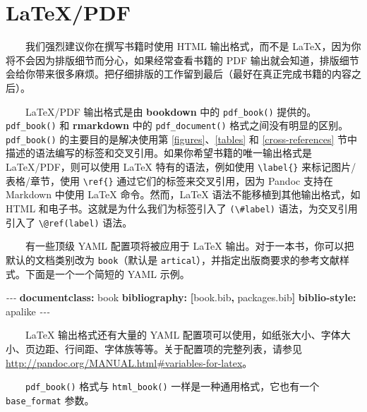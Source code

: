 \documentclass[
  12pt,
]{krantz}
\newenvironment{Shaded}{\begin{snugshade}}{\end{snugshade}}
\newcommand{\AttributeTok}[1]{\textcolor[rgb]{0.13,0.29,0.53}{#1}}
\newcommand{\FunctionTok}[1]{\textcolor[rgb]{0.13,0.29,0.53}{\textbf{#1}}}
\newcommand{\KeywordTok}[1]{\textcolor[rgb]{0.13,0.29,0.53}{\textbf{#1}}}
\newcommand{\PreprocessorTok}[1]{\textcolor[rgb]{0.56,0.35,0.01}{\textit{#1}}}
\theoremstyle{definition}
\theoremstyle{definition}
\theoremstyle{definition}
\theoremstyle{definition}
\theoremstyle{remark}
\begin{document}
\hypertarget{latexpdf}{%
\section{LaTeX/PDF}\label{latexpdf}}

  我们强烈建议你在撰写书籍时使用 HTML 输出格式，而不是 LaTeX，因为你将不会因为排版细节而分心，如果经常查看书籍的 PDF 输出就会知道，排版细节会给你带来很多麻烦。把仔细排版的工作留到最后（最好在真正完成书籍的内容之后）。

  LaTeX/PDF 输出格式是由 \textbf{bookdown} 中的 \texttt{pdf\_book()} 提供的。\texttt{pdf\_book()} 和 \textbf{rmarkdown} 中的 \texttt{pdf\_document()} 格式之间没有明显的区别。\texttt{pdf\_book()} 的主要目的是解决使用第 \ref{figures}、\ref{tables} 和 \ref{cross-references} 节中描述的语法编写的标签和交叉引用。如果你希望书籍的唯一输出格式是 LaTeX/PDF，则可以使用 LaTeX 特有的语法，例如使用 \texttt{\textbackslash{}label\{\}} 来标记图片/表格/章节，使用 \texttt{\textbackslash{}ref\{\}} 通过它们的标签来交叉引用，因为 Pandoc 支持在 Markdown 中使用 LaTeX 命令。然而，LaTeX 语法不能移植到其他输出格式，如 HTML 和电子书。这就是为什么我们为标签引入了 \texttt{(\textbackslash{}\#label)} 语法，为交叉引用引入了 \texttt{\textbackslash{}@ref(label)} 语法。

  有一些顶级 YAML 配置项将被应用于 LaTeX 输出。对于一本书，你可以把默认的文档类别改为 \texttt{book}（默认是 \texttt{artical}），并指定出版商要求的参考文献样式。下面是一个一个简短的 YAML 示例。

\begin{Shaded}
\begin{Highlighting}[]
\PreprocessorTok{{-}{-}{-}}
\FunctionTok{documentclass}\KeywordTok{:}\AttributeTok{ book}
\FunctionTok{bibliography}\KeywordTok{:}\AttributeTok{ }\KeywordTok{[}\AttributeTok{book.bib}\KeywordTok{,}\AttributeTok{ packages.bib}\KeywordTok{]}
\FunctionTok{biblio{-}style}\KeywordTok{:}\AttributeTok{ apalike}
\PreprocessorTok{{-}{-}{-}}
\end{Highlighting}
\end{Shaded}

  LaTeX 输出格式还有大量的 YAML 配置项可以使用，如纸张大小、字体大小、页边距、行间距、字体族等等。关于配置项的完整列表，请参见 \url{http://pandoc.org/MANUAL.html\#variables-for-latex}。

  \texttt{pdf\_book()} 格式与 \texttt{html\_book()} 一样是一种通用格式，它也有一个 \texttt{base\_format} 参数。
\end{document}
